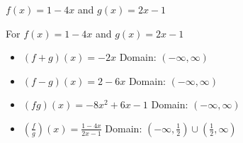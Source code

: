 {$f(x) = 1-4x$ and $g(x) = 2x-1$}
{For $f(x) = 1-4x$ and $g(x) = 2x-1$

\begin{itemize}
\item $(f+g)(x) = -2x$
      Domain: $(-\infty, \infty)$
\item $(f-g)(x) = 2-6x$
      Domain:  $(-\infty, \infty)$
\item $(fg)(x) = -8x^2+6x-1$ 
      Domain: $(-\infty, \infty)$
\item $\left(\frac{f}{g}\right)(x) = \frac{1-4x}{2x-1}$ 
      Domain:  $\left(-\infty, \frac{1}{2} \right) \cup \left(\frac{1}{2}, \infty \right)$
\end{itemize}
}